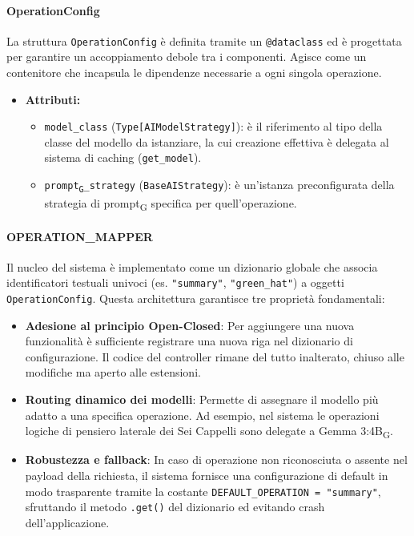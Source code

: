 \documentclass[11pt,a4paper]{article}
\newcommand{\gls}[1]{#1\textsubscript{G}}
\begin{document}
\paragraph{OperationConfig} 
La struttura \texttt{OperationConfig} è definita tramite un \texttt{@dataclass} ed è progettata per garantire un accoppiamento debole tra i componenti. Agisce come un contenitore che incapsula le dipendenze necessarie a ogni singola operazione.
\begin{itemize}
    \item\textbf{Attributi:}
    \begin{itemize}
        \item \texttt{model\_class} (\texttt{Type[AIModelStrategy]}): è il riferimento al tipo della classe del modello da istanziare, la cui creazione effettiva è delegata al sistema di caching (\texttt{get\_model}).
        \item \texttt{\gls{prompt}\_strategy} (\texttt{BaseAIStrategy}): è un'istanza preconfigurata della strategia di \gls{prompt} specifica per quell'operazione.
    \end{itemize}
\end{itemize}


\paragraph{OPERATION\_MAPPER}
Il nucleo del sistema è implementato come un dizionario globale che associa identificatori testuali univoci (es. \texttt{"summary"}, \texttt{"green\_hat"}) a oggetti \texttt{OperationConfig}. Questa architettura garantisce tre proprietà fondamentali:
\begin{itemize}
    \item \textbf{Adesione al principio Open-Closed}: Per aggiungere una nuova funzionalità è sufficiente registrare una nuova riga nel dizionario di configurazione. Il codice del controller rimane del tutto inalterato, chiuso alle modifiche ma aperto alle estensioni.
    \item \textbf{Routing dinamico dei modelli}: Permette di assegnare il modello più adatto a una specifica operazione. Ad esempio, nel sistema le operazioni logiche di pensiero laterale dei Sei Cappelli sono delegate a \gls{Gemma 3:4B}.
    \item \textbf{Robustezza e fallback}: In caso di operazione non riconosciuta o assente nel payload della richiesta, il sistema fornisce una configurazione di default in modo trasparente tramite la costante \texttt{DEFAULT\_OPERATION = "summary"}, sfruttando il metodo \texttt{.get()} del dizionario ed evitando crash dell'applicazione.
\end{itemize}
\end{document}
